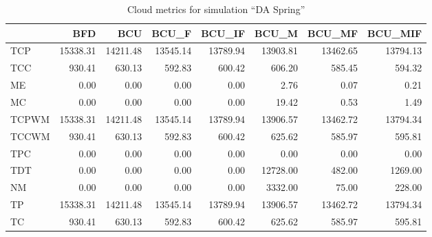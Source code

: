 \begin{table}[ht]
\centering
\begin{tabular}{lrrrrrrr}
\toprule
{} &       BFD &       BCU &     BCU\_F &    BCU\_IF &     BCU\_M &    BCU\_MF &   BCU\_MIF \\
\midrule
TCP   &  15338.31 &  14211.48 &  13545.14 &  13789.94 &  13903.81 &  13462.65 &  13794.13 \\
TCC   &    930.41 &    630.13 &    592.83 &    600.42 &    606.20 &    585.45 &    594.32 \\
ME    &      0.00 &      0.00 &      0.00 &      0.00 &      2.76 &      0.07 &      0.21 \\
MC    &      0.00 &      0.00 &      0.00 &      0.00 &     19.42 &      0.53 &      1.49 \\
TCPWM &  15338.31 &  14211.48 &  13545.14 &  13789.94 &  13906.57 &  13462.72 &  13794.34 \\
TCCWM &    930.41 &    630.13 &    592.83 &    600.42 &    625.62 &    585.97 &    595.81 \\
TPC   &      0.00 &      0.00 &      0.00 &      0.00 &      0.00 &      0.00 &      0.00 \\
TDT   &      0.00 &      0.00 &      0.00 &      0.00 &  12728.00 &    482.00 &   1269.00 \\
NM    &      0.00 &      0.00 &      0.00 &      0.00 &   3332.00 &     75.00 &    228.00 \\
TP    &  15338.31 &  14211.48 &  13545.14 &  13789.94 &  13906.57 &  13462.72 &  13794.34 \\
TC    &    930.41 &    630.13 &    592.83 &    600.42 &    625.62 &    585.97 &    595.81 \\
\bottomrule
\end{tabular}
\caption{Cloud metrics for simulation "`DA Spring"'}
\end{table}


